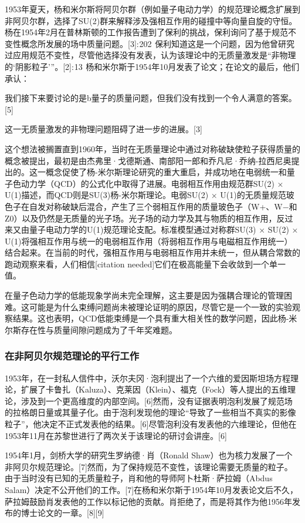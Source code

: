 1953年夏天，杨和米尔斯将阿贝尔群（例如量子电动力学）的规范理论概念扩展到非阿贝尔群，选择了SU(2)群来解释涉及强相互作用的碰撞中等向量自旋的守恒。杨在1954年2月在普林斯顿的工作报告遭到了保利的挑战，保利询问了基于规范不变性概念所发展的场中质量问题。[3]: 202  保利知道这是一个问题，因为他曾研究过应用规范不变性，尽管他选择没有发表，认为该理论中的无质量激发是“非物理的‘阴影粒子’”。[2]: 13  杨和米尔斯于1954年10月发表了论文；在论文的最后，他们承认：

我们接下来要讨论的是b量子的质量问题，但我们没有找到一个令人满意的答案。[5]

这一无质量激发的非物理问题阻碍了进一步的进展。[3]

这个想法被搁置直到1960年，当时在无质量理论中通过对称破缺使粒子获得质量的概念被提出，最初是由杰弗里·戈德斯通、南部阳一郎和乔凡尼·乔纳-拉西尼奥提出的。这一概念促使了杨-米尔斯理论研究的重大重启，并成功地在电弱统一和量子色动力学（QCD）的公式化中取得了进展。电弱相互作用由规范群SU(2) × U(1)描述，而QCD则是SU(3)杨-米尔斯理论。电弱SU(2) × U(1)的无质量规范玻色子在自发对称破缺后混合，产生了三个弱相互作用的质量玻色子（W+、W−和Z0）以及仍然是无质量的光子场。光子场的动力学及其与物质的相互作用，反过来又由量子电动力学的U(1)规范理论支配。标准模型通过对称群SU(3) × SU(2) × U(1)将强相互作用与统一的电弱相互作用（将弱相互作用与电磁相互作用统一）结合起来。在当前的时代，强相互作用与电弱相互作用并未统一，但从耦合常数的跑动观察来看，人们相信[citation needed]它们在极高能量下会收敛到一个单一值。

在量子色动力学的低能现象学尚未完全理解，这主要是因为强耦合理论的管理困难。这可能是为什么束缚问题尚未被理论证明的原因，尽管它是一个一致的实验观察结果。这也表明，QCD低能束缚是一个具有重大相关性的数学问题，因此杨-米尔斯存在性与质量间隙问题成为了千年奖难题。
\subsubsection{在非阿贝尔规范理论的平行工作}
1953年，在一封私人信件中，沃尔夫冈·泡利提出了一个六维的爱因斯坦场方程理论，扩展了卡鲁扎（Kaluza）、克莱因（Klein）、福克（Fock）等人提出的五维理论，涉及到一个更高维度的内部空间。[6]然而，没有证据表明泡利发展了规范场的拉格朗日量或其量子化。由于泡利发现他的理论“导致了一些相当不真实的影像粒子”，他决定不正式发表他的结果。[6]尽管泡利没有发表他的六维理论，但他在1953年11月在苏黎世进行了两次关于该理论的研讨会讲座。[6]

1954年1月，剑桥大学的研究生罗纳德·肖（Ronald Shaw）也为核力发展了一个非阿贝尔规范理论。[7]然而，为了保持规范不变性，该理论需要无质量的粒子。由于当时没有已知的无质量粒子，肖和他的导师阿卜杜斯·萨拉姆（Abdus Salam）决定不公开他们的工作。[7]在杨和米尔斯于1954年10月发表论文后不久，萨拉姆鼓励肖发表他的工作以标记他的贡献。肖拒绝了，而是将其作为他1956年发布的博士论文的一章。[8][9]
